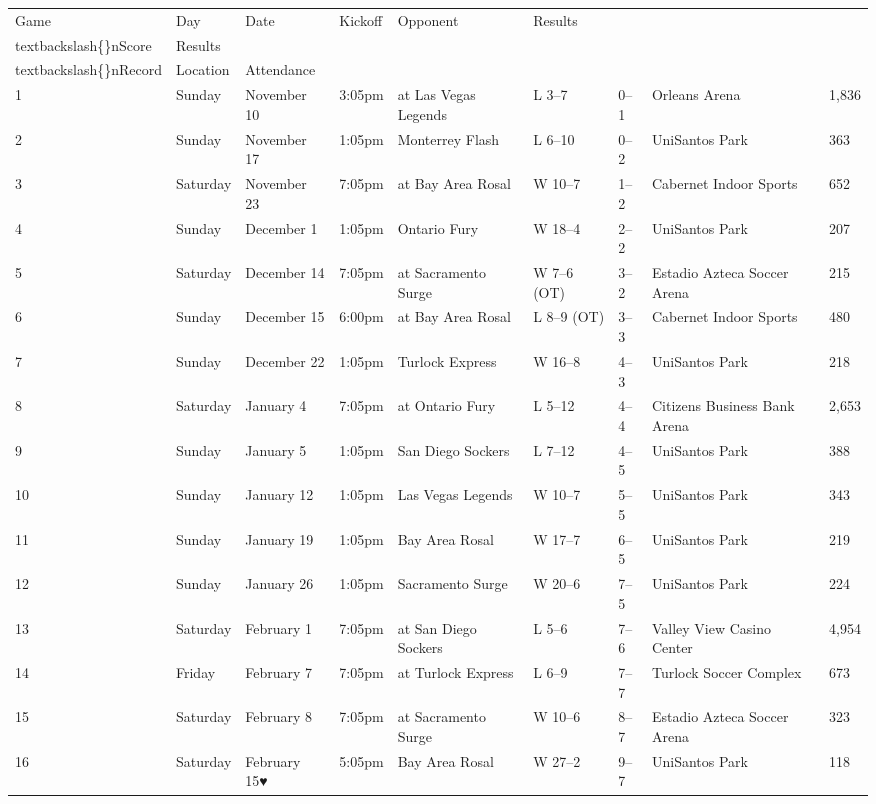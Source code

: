 \documentclass{article}
\begin{document}
\begin{tabular}{lllllllll}
\toprule
Game & Day & Date & Kickoff & Opponent & Results\\textbackslash\{\}nScore & Results\\textbackslash\{\}nRecord & Location & Attendance \\
\midrule
1 & Sunday & November 10 & 3:05pm & at Las Vegas Legends & L 3–7 & 0–1 & Orleans Arena & 1,836 \\
2 & Sunday & November 17 & 1:05pm & Monterrey Flash & L 6–10 & 0–2 & UniSantos Park & 363 \\
3 & Saturday & November 23 & 7:05pm & at Bay Area Rosal & W 10–7 & 1–2 & Cabernet Indoor Sports & 652 \\
4 & Sunday & December 1 & 1:05pm & Ontario Fury & W 18–4 & 2–2 & UniSantos Park & 207 \\
5 & Saturday & December 14 & 7:05pm & at Sacramento Surge & W 7–6 (OT) & 3–2 & Estadio Azteca Soccer Arena & 215 \\
6 & Sunday & December 15 & 6:00pm & at Bay Area Rosal & L 8–9 (OT) & 3–3 & Cabernet Indoor Sports & 480 \\
7 & Sunday & December 22 & 1:05pm & Turlock Express & W 16–8 & 4–3 & UniSantos Park & 218 \\
8 & Saturday & January 4 & 7:05pm & at Ontario Fury & L 5–12 & 4–4 & Citizens Business Bank Arena & 2,653 \\
9 & Sunday & January 5 & 1:05pm & San Diego Sockers & L 7–12 & 4–5 & UniSantos Park & 388 \\
10 & Sunday & January 12 & 1:05pm & Las Vegas Legends & W 10–7 & 5–5 & UniSantos Park & 343 \\
11 & Sunday & January 19 & 1:05pm & Bay Area Rosal & W 17–7 & 6–5 & UniSantos Park & 219 \\
12 & Sunday & January 26 & 1:05pm & Sacramento Surge & W 20–6 & 7–5 & UniSantos Park & 224 \\
13 & Saturday & February 1 & 7:05pm & at San Diego Sockers & L 5–6 & 7–6 & Valley View Casino Center & 4,954 \\
14 & Friday & February 7 & 7:05pm & at Turlock Express & L 6–9 & 7–7 & Turlock Soccer Complex & 673 \\
15 & Saturday & February 8 & 7:05pm & at Sacramento Surge & W 10–6 & 8–7 & Estadio Azteca Soccer Arena & 323 \\
16 & Saturday & February 15♥ & 5:05pm & Bay Area Rosal & W 27–2 & 9–7 & UniSantos Park & 118 \\
\bottomrule
\end{tabular}
\end{document}
